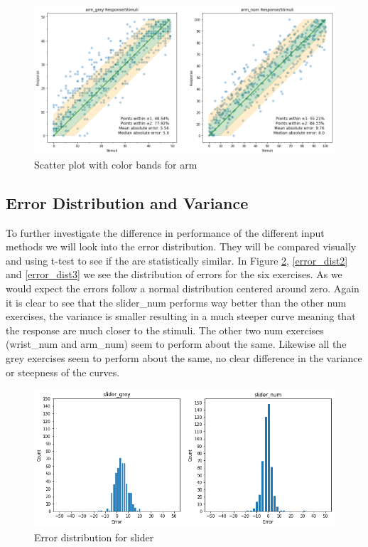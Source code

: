 \begin{figure}[p]
    \centering
    \includegraphics[width=1.15\textwidth]{figures/scatter_col3.png}
    \caption{Scatter plot with color bands for arm}
    \label{scatter_color3}
\end{figure}

\subsection{Error Distribution and Variance}
To further investigate the difference in performance of the different input methods we will look into the error distribution. They will be compared visually and using t-test to see if the are statistically similar. In Figure \ref{error_dist1}, \ref{error_dist2} and \ref{error_dist3} we see the distribution of errors for the six exercises. As we would expect the errors follow a normal distribution centered around zero. Again it is clear to see that the slider\_num performs way better than the other num exercises, the variance is smaller resulting in a much steeper curve meaning that the response are much closer to the stimuli. The other two num exercises (wrist\_num and arm\_num) seem to perform about the same. Likewise all the grey exercises seem to perform about the same, no clear difference in the variance or steepness of the curves.

\begin{figure}[p]
    \centering
    \includegraphics[width=1\textwidth]{figures/error_dist1.png}
    \caption{Error distribution for slider}
    \label{error_dist1}
\end{figure}

